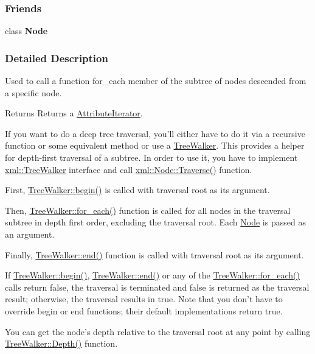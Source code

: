 \subsubsection*{Friends}
\begin{DoxyCompactItemize}
\item 
\hypertarget{classphys_1_1xml_1_1TreeWalker_a6db9d28bd448a131448276ee03de1e6d}{
class {\bfseries Node}}
\label{d5/d8d/classphys_1_1xml_1_1TreeWalker_a6db9d28bd448a131448276ee03de1e6d}

\end{DoxyCompactItemize}


\subsubsection{Detailed Description}
Used to call a function for\_\-each member of the subtree of nodes descended from a specific node. \begin{DoxyReturn}{Returns}
Returns a \hyperlink{classphys_1_1xml_1_1AttributeIterator}{AttributeIterator}.
\end{DoxyReturn}
If you want to do a deep tree traversal, you'll either have to do it via a recursive function or some equivalent method or use a \hyperlink{classphys_1_1xml_1_1TreeWalker}{TreeWalker}. This provides a helper for depth-\/first traversal of a subtree. In order to use it, you have to implement \hyperlink{classphys_1_1xml_1_1TreeWalker}{xml::TreeWalker} interface and call \hyperlink{classphys_1_1xml_1_1Node_a0029d08d3689c36d882ada0c0c9cf6e9}{xml::Node::Traverse()} function. \par
\par
 First, \hyperlink{classphys_1_1xml_1_1TreeWalker_a649d9e5a06542be0282d3d20994a62fc}{TreeWalker::begin()} is called with traversal root as its argument.\par
 Then, \hyperlink{classphys_1_1xml_1_1TreeWalker_a03267e73acac44809f16739fd00a536d}{TreeWalker::for\_\-each()} function is called for all nodes in the traversal subtree in depth first order, excluding the traversal root. Each \hyperlink{classphys_1_1xml_1_1Node}{Node} is passed as an argument.\par
 Finally, \hyperlink{classphys_1_1xml_1_1TreeWalker_a210f6d60579a152f89e651be797885b9}{TreeWalker::end()} function is called with traversal root as its argument.\par
\par
 If \hyperlink{classphys_1_1xml_1_1TreeWalker_a649d9e5a06542be0282d3d20994a62fc}{TreeWalker::begin()}, \hyperlink{classphys_1_1xml_1_1TreeWalker_a210f6d60579a152f89e651be797885b9}{TreeWalker::end()} or any of the \hyperlink{classphys_1_1xml_1_1TreeWalker_a03267e73acac44809f16739fd00a536d}{TreeWalker::for\_\-each()} calls return false, the traversal is terminated and false is returned as the traversal result; otherwise, the traversal results in true. Note that you don't have to override begin or end functions; their default implementations return true.\par
\par
 You can get the node's depth relative to the traversal root at any point by calling \hyperlink{classphys_1_1xml_1_1TreeWalker_a90fdd705ae4d5e8e3b931bb8896e4397}{TreeWalker::Depth()} function. 

